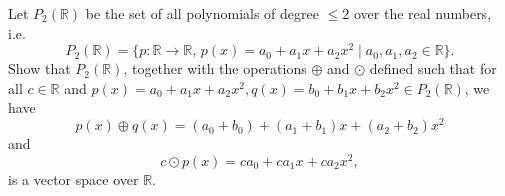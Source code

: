 \begin{example}
Let $ P_2(\mathbb{R}) $ be the set of all polynomials of degree $ \leq 2 $ over the real numbers, i.e.
\begin{equation*}
    P_2(\mathbb{R})=\{p:\mathbb{R}\to\mathbb{R},\,p(x)=a_0+a_1x+a_2x^2\mid a_0,a_1,a_2\in\mathbb{R}\}.
\end{equation*}
Show that $ P_2(\mathbb{R}) $, together with the operations $ \oplus $ and $ \odot $ defined such that for all $ c\in\mathbb{R} $ and $ p(x)=a_0+a_1x+a_2x^2,q(x)=b_0+b_1x+b_2x^2\in P_2(\mathbb{R}) $, we have
\begin{equation*}
    p(x)\oplus q(x)=(a_0+b_0)+(a_1+b_1)x+(a_2+b_2)x^2
\end{equation*}
and
\begin{equation*}
    c\odot p(x)=ca_0+ca_1x+ca_2x^2,
\end{equation*}
is a vector space over $ \mathbb{R} $.
\end{example}
